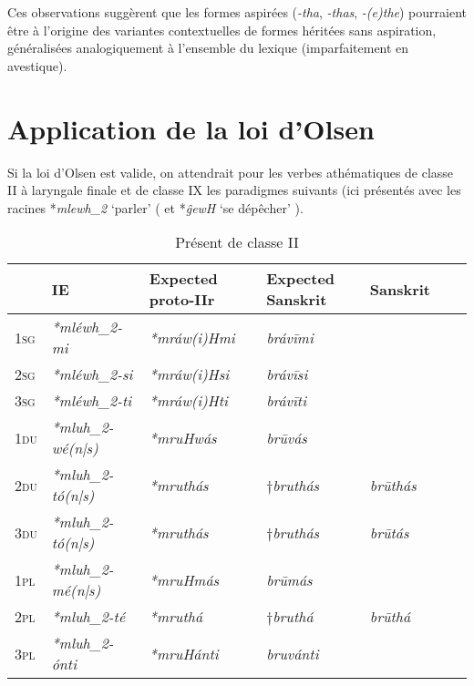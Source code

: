 \documentclass[oldfontcommands,oneside,a4paper,11pt]{article}
\newcommand{\ipa}[1]{{\phon\textit{#1}}} %
\newcommand{\grise}[1]{\cellcolor{lightgray}\textbf{#1}}
\begin{document}
Ces observations suggèrent que les formes aspirées (\ipa{-tha}, \ipa{-thas}, \ipa{-(e)the}) pourraient être à l'origine des variantes contextuelles de formes héritées sans aspiration, généralisées analogiquement à l'ensemble du lexique (imparfaitement en avestique).

\section{Application de la loi d'Olsen}
Si la loi d'Olsen est valide, on attendrait pour les verbes athématiques de classe II à laryngale finale et de classe IX les paradigmes suivants (ici présentés avec les racines *\ipa{mlewh_2} `parler' (\citealt[446]{liv} et *\ipa{ĝewH} `se dépêcher' \citealt[166]{liv}).


\begin{table}[H]
\caption{Présent de classe II} \label{tab:II}
\begin{tabular}{lllllll}
\toprule
 & 	IE  & 	Expected proto-IIr & 	Expected Sanskrit & 	Sanskrit   	\\
\midrule
\textsc{1sg} & 	\ipa{*mléwh_2-mi} & 	\ipa{*mráw(i)Hmi} & 	\ipa{brávīmi} & 	  & 	\\
\textsc{2sg} & 	\ipa{*mléwh_2-si} & 	\ipa{*mráw(i)Hsi} & 	\ipa{brávīsi} & 	 & 	\\
\textsc{3sg} & 	\ipa{*mléwh_2-ti} & 	\ipa{*mráw(i)Hti} & 	\ipa{brávīti} &   & 	\\
\textsc{1du} & 	\ipa{*mluh_2-wé(n|s)} & 	\ipa{*mruHwás} & 	\ipa{brūvás} & 	  & 	\\
\textsc{2du} & 	\ipa{*mluh_2-tó(n|s)} & 	\ipa{*mruthás} \grise{}& 	$\dagger$\ipa{bruthás} \grise{}& 	\ipa{brūthás} & 	\\
\textsc{3du} & 	\ipa{*mluh_2-tó(n|s)} & 	\ipa{*mruthás}  \grise{} & $\dagger$\ipa{bruthás} \grise{} & 	\ipa{brūtás} & 	\\
\textsc{1pl} & 	\ipa{*mluh_2-mé(n|s)} & 	\ipa{*mruHmás} & 	\ipa{brūmás} & 	  & 	\\
\textsc{2pl} & 	\ipa{*mluh_2-té} & 	\ipa{*mruthá}  \grise{}& 	$\dagger$\ipa{bruthá}  \grise{}& 	\ipa{brūthá} & 	\\
\textsc{3pl} & 	\ipa{*mluh_2-ónti} & 	\ipa{*mruHánti} & 	\ipa{bruvánti} &  & 	\\
\bottomrule
\end{tabular}
\end{table}
\end{document}
